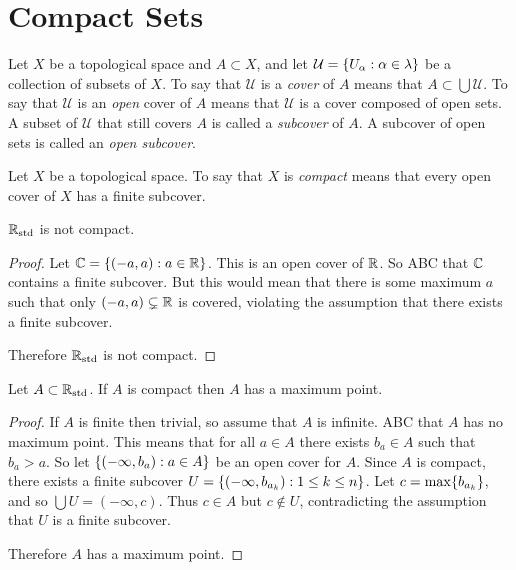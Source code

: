 \documentclass[letterpaper,12pt,fleqn]{article}
\newcommand{\U}{\mathcal{U}}
\renewcommand{\a}{\alpha}
\renewcommand{\l}{\lambda}
\newcommand{\Rs}{\R_{\text{std}}}
\begin{document}
\section*{Compact Sets}

\begin{definition}[Cover]
  Let \(X\) be a topological space and \(A\subset X\), and let \(\U=\set{U_{\a}:\a\in\l}\) be a collection of subsets
  of \(X\).  To say that \(\U\) is a \emph{cover} of \(A\) means that \(A\subset\bigcup\U\).  To say that \(\U\) is
  an \emph{open} cover of \(A\) means that \(\U\) is a cover composed of open sets.  A subset of \(\U\) that still
  covers \(A\) is called a \emph{subcover} of \(A\).  A subcover of open sets is called an \emph{open subcover}.
\end{definition}

\begin{definition}[Compact]
  Let \(X\) be a topological space.  To say that \(X\) is \emph{compact} means that every open cover of \(X\) has a
  finite subcover.
\end{definition}

\begin{theorem}
  \(\Rs\) is not compact.
\end{theorem}

\begin{proof}
  Let \(\mathbb{C}=\{(-a,a):a\in\mathbb{R}\}\).  This is an open cover of \(\mathbb{R}\).  So ABC that \(\mathbb{C}\) contains a finite subcover.
  But this would mean that there is some maximum \(a\) such that only \((-a,a)\subsetneq\mathbb{R}\) is covered, violating
  the assumption that there exists a finite subcover.

  Therefore \(\Rs\) is not compact.
\end{proof}

\begin{theorem}
  Let \(A\subset\Rs\).  If \(A\) is compact then \(A\) has a maximum point.
\end{theorem}

\begin{proof}
  If \(A\) is finite then trivial, so assume that \(A\) is infinite.  ABC that \(A\) has no maximum point.  This
  means that for all \(a\in A\) there exists \(b_a\in A\) such that \(b_a>a\).  So let \(\{(-\infty,b_a):a\in A\}\)
  be an open cover for \(A\).  Since \(A\) is compact, there exists a finite subcover
  \(U=\{(-\infty,b_{a_k}):1\le k\le n\}\).  Let \(c=\max\{b_{a_k}\}\), and so \(\bigcup U=(-\infty,c)\).  Thus
  \(c\in A\) but \(c\notin U\), contradicting the assumption that \(U\) is a finite subcover.

  Therefore \(A\) has a maximum point.
\end{proof}
\end{document}
